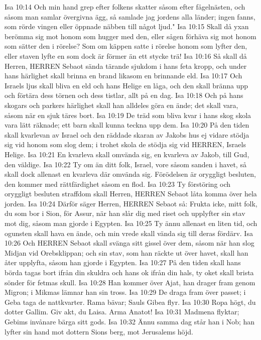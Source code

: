 Isa 10:14  Och min hand grep efter folkens skatter såsom efter fågelnästen, och såsom man samlar övergivna ägg, så samlade jag jordens alla länder; ingen fanns, som rörde vingen eller öppnade näbben till något ljud."
Isa 10:15  Skall då yxan berömma sig mot honom som hugger med den, eller sågen förhäva sig mot honom som sätter den i rörelse? Som om käppen satte i rörelse honom som lyfter den, eller staven lyfte en som dock är förmer än ett stycke trä!
Isa 10:16  Så skall då Herren, HERREN Sebaot sända tärande sjukdom i hans feta kropp, och under hans härlighet skall brinna en brand likasom en brinnande eld.
Isa 10:17  Och Israels ljus skall bliva en eld och hans Helige en låga, och den skall bränna upp och förtära dess törnen och dess tistlar, allt på en dag.
Isa 10:18  Och på hans skogars och parkers härlighet skall han alldeles göra en ände; det skall vara, såsom när en sjuk täres bort.
Isa 10:19  De träd som bliva kvar i hans skog skola vara lätt räknade; ett barn skall kunna teckna upp dem.
Isa 10:20  På den tiden skall kvarlevan av Israel och den räddade skaran av Jakobs hus ej vidare stödja sig vid honom som slog dem; i trohet skola de stödja sig vid HERREN, Israels Helige.
Isa 10:21  En kvarleva skall omvända sig, en kvarleva av Jakob, till Gud, den väldige.
Isa 10:22  Ty om än ditt folk, Israel, vore såsom sanden i havet, så skall dock allenast en kvarleva där omvända sig. Förödelsen är oryggligt besluten, den kommer med rättfärdighet såsom en flod.
Isa 10:23  Ty förstöring och oryggligt besluten straffdom skall Herren, HERREN Sebaot låta komma över hela jorden.
Isa 10:24  Därför säger Herren, HERREN Sebaot så: Frukta icke, mitt folk, du som bor i Sion, för Assur, när han slår dig med riset och upplyfter sin stav mot dig, såsom man gjorde i Egypten.
Isa 10:25  Ty ännu allenast en liten tid, och ogunsten skall hava en ände, och min vrede skall vända sig till deras fördärv.
Isa 10:26  Och HERREN Sebaot skall svänga sitt gissel över dem, såsom när han slog Midjan vid Orebsklippan; och sin stav, som han räckte ut över havet, skall han åter upplyfta, såsom han gjorde i Egypten.
Isa 10:27  På den tiden skall hans börda tagas bort ifrån din skuldra och hans ok ifrån din hals, ty oket skall brista sönder för fetmas skull.
Isa 10:28  Han kommer över Ajat, han drager fram genom Migron; i Mikmas lämnar han sin tross.
Isa 10:29  De draga fram över passet; i Geba taga de nattkvarter. Rama bävar; Sauls Gibea flyr.
Isa 10:30  Ropa högt, du dotter Gallim. Giv akt, du Laisa. Arma Anatot!
Isa 10:31  Madmena flyktar; Gebims invånare bärga sitt gods.
Isa 10:32  Ännu samma dag står han i Nob; han lyfter sin hand mot dottern Sions berg, mot Jerusalems höjd.
